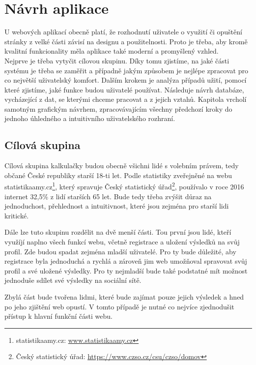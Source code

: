 \chapter{Návrh aplikace}
\label{chap:navrh}
U webových aplikací obecně platí, že rozhodnutí uživatele o využití či opuštění stránky z velké části závisí na designu a použitelnosti. Proto je třeba, aby kromě kvalitní funkcionality měla aplikace také moderní a promyšlený vzhled. \\
Nejprve je třeba vytyčit cílovou skupinu. Díky tomu zjistíme, na jaké části systému je třeba se zaměřit a případně jakým způsobem je nejlépe zpracovat pro co největší uživatelský komfort. Dalším krokem je analýza případů užití, pomocí které zjistíme, jaké funkce budou uživatelé používat. Následuje návrh databáze, vycházející z dat, se kterými chceme pracovat a z jejich vztahů. Kapitola vrcholí samotným grafickým návrhem, zpracovávajícím všechny předchozí kroky do jednoho úhledného a intuitivního uživatelského rozhraní.


\section{Cílová skupina}
Cílová skupina kalkulačky budou obecně všichni lidé s volebním právem, tedy občané České republiky starší 18-ti let.\cite{ustava-volebni_pravo} Podle statistiky zveřejněné na webu statistikaamy.cz\footnote{statistikaamy.cz: \url{www.statistikaamy.cz}}, který spravuje Český statistický úřad\footnote{Český statistický úřad: \url{https://www.czso.cz/csu/czso/domov}}, používalo v roce 2016 internet 32,5\% z lidí starších 65 let\cite{statistikaamy}. Bude tedy třeba zvýšit důraz na jednoduchost, přehlednost a intuitivnost, které jsou zejména pro starší lidi kritické.
\par Dále lze tuto skupinu rozdělit na dvě menší části. Tou první jsou lidé, kteří využíjí naplno všech funkcí webu, včetně registrace a uložení výsledků na svůj profil. Zde budou spadat zejména mladší uživatelé. Pro ty bude důležité, aby registrace byla jednoduchá a rychlá a zároveň jim web umožňoval spravovat svůj profil a své uložené výsledky. Pro ty nejmladší bude také podstatné mít možnost jednoduše sdílet své výsledky na sociální sítě.
\par Zbylá část bude tvořena lidmi, které bude zajímat pouze jejich výsledek a hned po jeho zjištění web opustí. V tomto případě je nutné co nejvíce zjednodušit přístup k hlavní funkční části webu.


